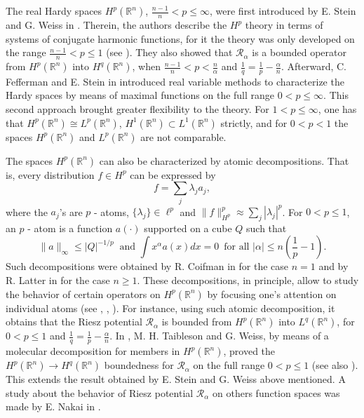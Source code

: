 \documentclass[leqno,12pt]{article} %
\theoremstyle{plain} %
\theoremstyle{definition} %
\begin{document}
The real Hardy spaces $H^p(\mathbb{R}^n)$, $\frac{n-1}{n} < p \leq \infty$, were first introduced by E. Stein and G. Weiss in \cite{Weiss}. Therein, the authors describe the $H^p$ theory in terms of systems of conjugate harmonic functions, for it the theory was only developed on the range $\frac{n-1}{n} < p \leq 1$ (see \cite[\S 5.16]{St}). They also showed that $\mathcal{R}_{\alpha}$ is a bounded operator from 
$H^p(\mathbb{R}^n)$ into $H^q(\mathbb{R}^n)$, when $\frac{n-1}{n} < p < \frac{n}{\alpha}$ and $\frac{1}{q} = \frac{1}{p} - \frac{\alpha}{n}$. 
Afterward, C. Fefferman and E. Stein in \cite{Feff} introduced real variable methods to characterize the Hardy spaces by means of maximal functions on the full range $0 < p \leq \infty$. This second approach brought greater flexibility to the theory. For $1 < p \leq \infty$, 
one has that $H^{p}(\mathbb{R}^{n}) \cong L^{p}(\mathbb{R}^{n})$, $H^{1}(\mathbb{R}^{n}) \subset L^{1}(\mathbb{R}^{n})$ strictly, and for 
$0 < p < 1$ the spaces $H^{p}(\mathbb{R}^{n})$ and $L^{p}(\mathbb{R}^{n})$ are not comparable.

The spaces $H^{p}(\mathbb{R}^{n})$ can also be characterized by atomic decompositions. That is, every distribution $f \in H^{p}$ can be expressed by
\[
f = \sum_j \lambda_j a_j, 
\]
where the $a_j$'s are $p$ - atoms, $\{ \lambda_j \} \in \ell^{p}$ and $\| f \|^{p}_{H^{p}} \approx \sum_j | \lambda_j |^{p}$.
For $0 < p \leq 1$, an $p$ - atom is a function $a(\cdot)$ supported on a cube $Q$ such that
\[
\| a \|_{\infty} \leq |Q|^{-1/p} \,\,\  \text{and} \,\, \int x^{\alpha} a(x) dx = 0 \,\,\, \text{for all} \,\, |\alpha| \leq 
n \left( \frac{1}{p}-1 \right).
\]
Such decompositions were obtained by R. Coifman in \cite{Coif} for the case $n=1$ and by R. Latter in \cite{Latter} for the case $n \geq 1$. 
These decompositions, in principle, allow to study the behavior of certain operators on $H^{p}(\mathbb{R}^{n})$ by focusing one's 
attention on individual atoms (see \cite{Bownik}, \cite{Ricci}, \cite{Pablo}). For instance, using such atomic decomposition, it obtains that the Riesz potential $\mathcal{R}_{\alpha}$ is bounded from $H^p(\mathbb{R}^n)$ into $L^q(\mathbb{R}^n)$, for $0 < p \leq 1$ and 
$\frac{1}{q} = \frac{1}{p} - \frac{\alpha}{n}$. In \cite{Taible}, M. H. Taibleson and G. Weiss, by means of a molecular decomposition for members in $H^p(\mathbb{R}^n)$, proved the $H^p(\mathbb{R}^n) \to H^q(\mathbb{R}^n)$ boundedness for $\mathcal{R}_{\alpha}$ on the full range 
$0 < p \leq 1$ (see also \cite{Krantz}). This extends the result obtained by E. Stein and G. Weiss above mentioned. A study about the 
behavior of Riesz potential $\mathcal{R}_{\alpha}$ on others function spaces was made by E. Nakai in \cite{Nakai}.  
 
\end{document}
